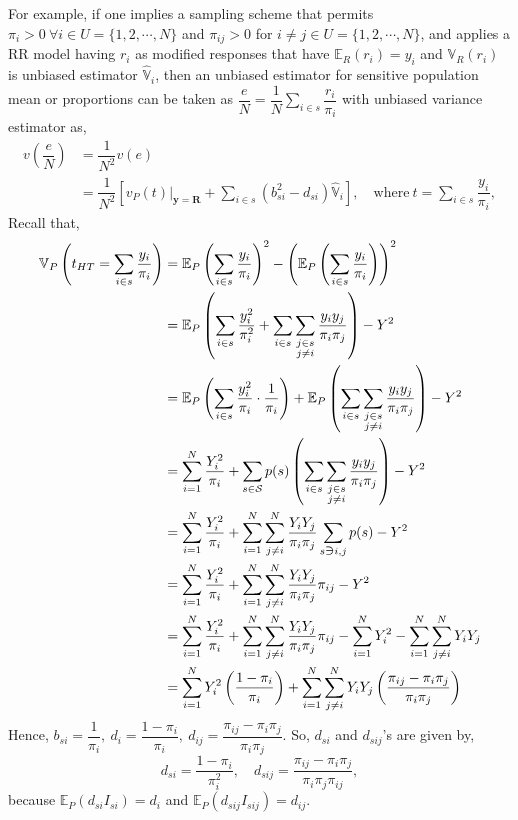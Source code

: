 \documentclass[12pt]{article}
\newcommand{\E}{\mathbb{E}}
\newcommand{\Var}{\mathbb{V}}
\newcommand{\contains}{\reflectbox{$\in$}}
\theoremstyle{definition}
\begin{document}
For example, if one implies a sampling scheme that permits $\pi_i > 0\ \forall i \in U = \{1,2,\cdots,N\}$ and $\pi_{ij}>0$ for $i\neq j \in U = \{1,2,\cdots,N\}$, and applies a RR model having $r_i$ as modified responses that have $\E_R(r_i)=y_i$ and $\Var_R(r_i)$ is unbiased estimator $\hat{\Var}_i$, then an unbiased estimator for sensitive population mean or proportions can be taken as $\dfrac{e}{N}=\dfrac{1}{N}\sum_{i \in s}\dfrac{r_i}{\pi_i}$ with unbiased variance estimator as,
\begin{align*}
    v\left(\dfrac{e}{N}\right)& = \dfrac{1}{N^2}v(e)\\
    & =\dfrac{1}{N^2} \left[\left.v_P(t)\right|_{\mathbf{y}=\mathbf{R}}+\sum_{i\in s} (b_{si}^2-d_{si})\hat{\Var}_i \right],\quad \text{where}\  t=\sum_{i \in s}\dfrac{y_i}{\pi_i},
\end{align*}
Recall that,
\begin{align*}
    \Var_P\left(t_{HT}=\sum_{i \in s}\dfrac{y_i}{\pi_i}\right) & = \E_P\left(\sum_{i \in s}\dfrac{y_i}{\pi_i}\right)^2-\left(\E_P\left(\sum_{i \in s}\dfrac{y_i}{\pi_i}\right)\right)^2\\
    & = \E_P\left(\sum_{i \in s}\dfrac{y_i^2}{\pi_i^2}+\sum_{i \in s}\sum_{\substack{j\in s \\ j\neq i}}\dfrac{y_iy_j}{\pi_i\pi_j}\right)-Y^2\\
    & = \E_P\left(\sum_{i \in s}\dfrac{y_i^2}{\pi_i}\cdot \dfrac{1}{\pi_i}\right)+\E_P\left(\sum_{i \in s}\sum_{\substack{j\in s \\ j\neq i}}\dfrac{y_iy_j}{\pi_i\pi_j}\right)-Y^2\\
    & = \sum_{i=1}^N \dfrac{Y_i^2}{\pi_i}+ \sum_{s \in \mathcal{S}}p(s)\left(\sum_{i \in s}\sum_{\substack{j\in s \\ j\neq i}}\dfrac{y_iy_j}{\pi_i\pi_j}\right)-Y^2 \\
    & = \sum_{i=1}^N \dfrac{Y_i^2}{\pi_i} + \sum_{i=1}^N\sum_{j\neq i}^N\dfrac{Y_iY_j}{\pi_i\pi_j}\sum_{s \contains i,j} p(s) -Y^2\\
    & = \sum_{i=1}^N \dfrac{Y_i^2}{\pi_i} + \sum_{i=1}^N\sum_{j\neq i}^N\dfrac{Y_iY_j}{\pi_i\pi_j}\pi_{ij} - Y^2\\
    & = \sum_{i=1}^N \dfrac{Y_i^2}{\pi_i} + \sum_{i=1}^N\sum_{j\neq i}^N\dfrac{Y_iY_j}{\pi_i\pi_j}\pi_{ij} - \sum_{i=1}^N Y_i^2 - \sum_{i=1}^N\sum_{j\neq i}^N Y_i Y_j \\
    & = \sum_{i=1}^N Y_i^2 \left(\dfrac{1-\pi_i}{\pi_i}\right) + \sum_{i=1}^N\sum_{j\neq i}^N Y_i Y_j \left(\dfrac{\pi_{ij}-\pi_i\pi_j}{\pi_i\pi_j}\right)
\end{align*}
Hence, $b_{si}=\dfrac{1}{\pi_i},\ d_i = \dfrac{1-\pi_i}{\pi_i},\ d_{ij}= \dfrac{\pi_{ij}-\pi_i\pi_j}{\pi_i\pi_j}$. So, $d_{si}$ and $d_{sij}$'s are given by,
$$d_{si}=\dfrac{1-\pi_i}{\pi_i^2},\quad d_{sij}= \dfrac{\pi_{ij}-\pi_i\pi_j}{\pi_i\pi_j\pi_{ij}},$$
because $\E_P(d_{si}I_{si})=d_i$ and $\E_P(d_{sij}I_{sij})=d_{ij}$.
\end{document}
